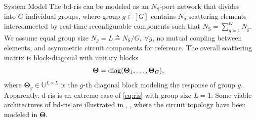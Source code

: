 \documentclass[journal]{IEEEtran}
\begin{document}
\begin{section}{System Model}
		The \gls{bd}-\gls{ris} can be modeled as an $N_\mathrm{S}$-port network \cite{Ivrlac2010} that divides into $G$ individual groups, where group $g \in [G]$ contains $N_g$ scattering elements interconnected by real-time reconfigurable components \cite{Shen2020a} such that $N_\mathrm{S} = \sum_{g=1}^G N_g$.
		We assume equal group size $N_g = L \triangleq N_\mathrm{S} / G, \ \forall g$, no mutual coupling between elements, and asymmetric circuit components for reference.
		The overall scattering matrix is block-diagonal with unitary blocks
		\begin{equation}
			\label{eq:ris}
			\mathbf{\Theta} = \operatorname{diag}(\mathbf{\Theta}_1,\ldots,\mathbf{\Theta}_G),
		\end{equation}
		where $\mathbf{\Theta}_g \in \mathbb{U}^{L \times L}$ is the $g$-th diagonal block modeling the response of group $g$.
		Apparently, \gls{d}-\gls{ris} is an extreme case of \eqref{eq:ris} with group size $L=1$.
		Some viable architectures of \gls{bd}-\gls{ris} are illustrated in \cite[Fig. 3]{Shen2020a}, \cite[Fig. 5]{Li2023c}, \cite[Fig. 2]{Nerini2024} where the circuit topology have been modeled in $\mathbf{\Theta}$.


\end{section}
\end{document}
